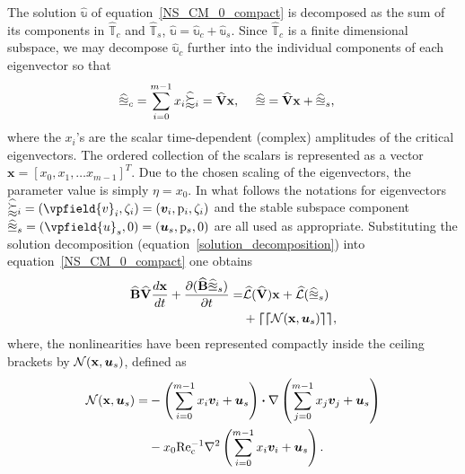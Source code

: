 The solution $\mathbb{\widehat{u}}$ of equation~\eqref{NS_CM_0_compact} is decomposed as the sum of its components in $\mathds{\widehat{T}}_{c}$ and $\mathds{\widehat{T}}_{s}$, \ie $\mathbb{\widehat{u}} = \mathbb{\widehat{u}}_{c} + \mathbb{\widehat{u}}_{s}$.  Since $\mathds{\widehat{T}}_{c}$ is a finite dimensional subspace, we may decompose $\mathbb{\widehat{u}}_{c}$ further into the individual components of each eigenvector so that 
\begin{eqnarray}
	\mathbb{\widehat{u}}_{c} = \sum_{i=0}^{m-1}x_{i}\mathbb{\widehat{v}}_{i} = \mathbf{\widehat{V}}\mathbf{x},
	& \hspace{5mm}
	\mathbb{\widehat{u}} = \mathbf{\widehat{V}}\mathbf{x} + \mathbb{\widehat{u}}_{s} \label{solution_decomposition},
\end{eqnarray}
where the $x_{i}$'s are the scalar time-dependent (complex) amplitudes of the critical eigenvectors. The ordered collection of the scalars is represented as a vector $\mathbf{x} = [x_{0}, x_{1},\ldots x_{m-1}]^{T}$. Due to the chosen scaling of the eigenvectors, the parameter value is simply $\eta = x_{0}$. In what follows the notations for eigenvectors $\efield{v}_{i} = (\vpfield{v}_{i},\zeta_{i}) = (\vfield{v}_{i},\pfield{p}_{i},\zeta_{i})$ and the stable subspace component $\efield{u}_{s} = (\vpfield{u}_{s},0) = (\vfield{u}_{s},\pfield{p}_{s},0)$ are all used as appropriate. 
Substituting the solution decomposition (equation~\eqref{solution_decomposition}) into equation~\eqref{NS_CM_0_compact} one obtains
\begin{equation}
	\label{NS_CM_1}
	\begin{aligned}
	\mathbf{\widehat{B}}\mathbf{\widehat{V}}\frac{d \mathbf{x}}{d t} + \frac{\partial (\mathbf{\widehat{B}}\mathbb{\widehat{u}}_{s})}{\partial t} =&
	\mathcal{\widehat{L}}(\mathbf{\widehat{V}})\mathbf{x}  + \mathcal{\widehat{L}}(\mathbb{\widehat{u}}_{s}) \\
	& + \boldsymbol{\lceil}\boldsymbol{\lceil}\mathcal{N}(\mathbf{x},\boldsymbol{u}_{s}) \boldsymbol{\rceil}\boldsymbol{\rceil},
\end{aligned}
\end{equation}
where, the nonlinearities have been represented compactly inside the ceiling brackets by $\mathcal{N}(\mathbf{x},\boldsymbol{u}_{s})$, defined as
\begin{equation}
	\begin{aligned}
		\mathcal{N}(\mathbf{x},\boldsymbol{u}_{s}) =&
			-\left(\sum_{i=0}^{m-1}x_{i}\boldsymbol{v}_{i} + \boldsymbol{u}_{s} \right)\boldsymbol{\cdot}\nabla \left(\sum_{j=0}^{m-1}x_{j}\boldsymbol{v}_{j} + \boldsymbol{u}_{s}\right) \\
			&- x_{0}\mathrm{Re_{c}^{-1}}\nabla^{2} \left(\sum_{i=0}^{m-1}x_{i}\boldsymbol{v}_{i} + \boldsymbol{u}_{s} \right).
		\end{aligned} \nonumber
\end{equation}

